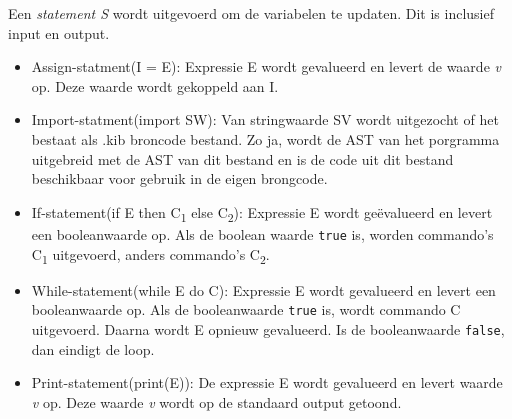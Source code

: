 Een \emph{statement S} wordt uitgevoerd om de variabelen te updaten. Dit is inclusief input en output.
\begin{itemize}
    \item Assign-statment(I = E): Expressie E wordt gevalueerd en levert de waarde \emph{v} op. Deze waarde wordt gekoppeld aan I.
    \item Import-statment(import SW): Van stringwaarde SV wordt uitgezocht of het bestaat als .kib broncode bestand. Zo ja, wordt de AST van het porgramma uitgebreid met de AST van dit bestand en is de code uit dit bestand beschikbaar voor gebruik in de eigen brongcode.
    \item If-statement(if E then C\textsubscript{1} else C\textsubscript{2}): Expressie E wordt ge\"evalueerd en levert een booleanwaarde op. Als de boolean waarde \texttt{true} is, worden commando's C\textsubscript{1} uitgevoerd, anders commando's C\textsubscript{2}. 
    \item While-statement(while E do C): Expressie E wordt gevalueerd en levert een booleanwaarde op. Als de booleanwaarde \texttt{true} is, wordt commando C uitgevoerd. Daarna wordt E opnieuw gevalueerd. Is de booleanwaarde \texttt{false}, dan eindigt de loop.
    \item Print-statement(print(E)): De expressie E wordt gevalueerd en levert waarde \emph{v} op. Deze waarde \emph{v} wordt op de standaard output getoond.
\end{itemize}

